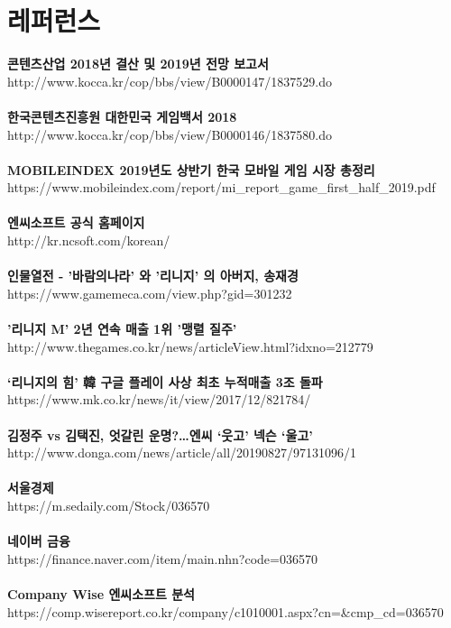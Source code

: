 \documentclass[11pt]{oblivoir}
\begin{document}
	\pagebreak
	\section{레퍼런스}
		\noindent
		\textbf{콘텐츠산업 2018년 결산 및 2019년 전망 보고서}
		\\
		http://www.kocca.kr/cop/bbs/view/B0000147/1837529.do
		\\
		\\
		\textbf{한국콘텐츠진흥원 대한민국 게임백서 2018}
		\\
		http://www.kocca.kr/cop/bbs/view/B0000146/1837580.do
		\\
		\\
		\textbf{MOBILEINDEX 2019년도 상반기 한국 모바일 게임 시장 총정리}
		\\
		https://www.mobileindex.com/report/mi\_report\_game\_first\_half\_2019.pdf
		\\
		\\
		\textbf{엔씨소프트 공식 홈페이지} 
		\\
		http://kr.ncsoft.com/korean/
		\\
		\\
		\textbf{인물열전 - '바람의나라' 와 '리니지' 의 아버지, 송재경}
		\\
		https://www.gamemeca.com/view.php?gid=301232
		\\
		\\
		\textbf{'리니지 M' 2년 연속 매출 1위 '맹렬 질주'}
		\\
		http://www.thegames.co.kr/news/articleView.html?idxno=212779
		\\
		\\
		\textbf{‘리니지의 힘’ 韓 구글 플레이 사상 최초 누적매출 3조 돌파}
		\\ 
		https://www.mk.co.kr/news/it/view/2017/12/821784/
		\\
		\\
		\textbf{김정주 vs 김택진, 엇갈린 운명?…엔씨 ‘웃고’ 넥슨 ‘울고’}
		\\
		http://www.donga.com/news/article/all/20190827/97131096/1
		\\
		\\
		\textbf{서울경제}
		\\
		https://m.sedaily.com/Stock/036570
		\\
		\\
		\textbf{네이버 금융}
		\\
		https://finance.naver.com/item/main.nhn?code=036570
		\\
		\\
		\textbf{Company Wise 엔씨소프트 분석}
		\\
		https://comp.wisereport.co.kr/company/c1010001.aspx?cn=\&cmp\_cd=036570
	
\end{document}
